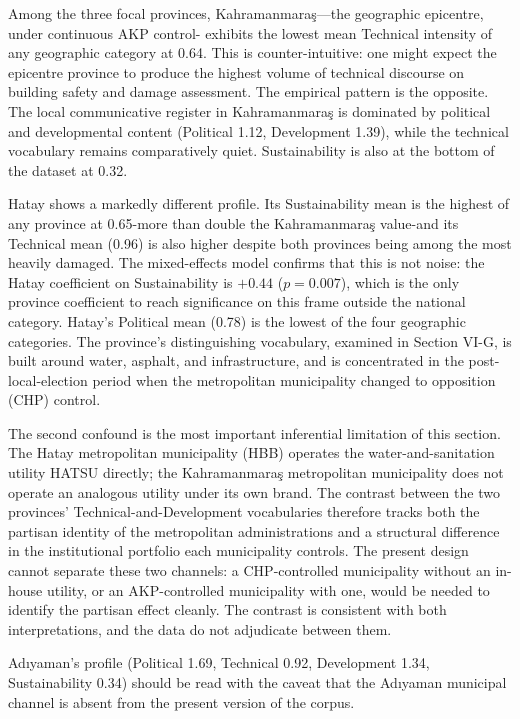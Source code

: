 \documentclass[12pt, journal]{IEEEtran}
\begin{document}
Among the three focal provinces, Kahramanmara\c{s}---the geographic epicentre, under continuous AKP control- exhibits the lowest mean Technical intensity of any geographic category at 0.64. This is counter-intuitive: one might expect the epicentre province to produce the highest volume of technical discourse on building safety and damage assessment. The empirical pattern is the opposite. The local communicative register in Kahramanmara\c{s} is dominated by political and developmental content (Political 1.12, Development 1.39), while the technical vocabulary remains comparatively quiet. Sustainability is also at the bottom of the dataset at 0.32.

Hatay shows a markedly different profile. Its Sustainability mean is the highest of any province at 0.65-more than double the Kahramanmara\c{s} value-and its Technical mean (0.96) is also higher despite both provinces being among the most heavily damaged. The mixed-effects model confirms that this is not noise: the Hatay coefficient on Sustainability is $+0.44$ ($p = 0.007$), which is the only province coefficient to reach significance on this frame outside the national category. Hatay's Political mean (0.78) is the lowest of the four geographic categories. The province's distinguishing vocabulary, examined in Section VI-G, is built around water, asphalt, and infrastructure, and is concentrated in the post-local-election period when the metropolitan municipality changed to opposition (CHP) control.

The second confound is the most important inferential limitation of this section. The Hatay metropolitan municipality (HBB) operates the water-and-sanitation utility HATSU directly; the Kahramanmara\c{s} metropolitan municipality does not operate an analogous utility under its own brand. The contrast between the two provinces' Technical-and-Development vocabularies therefore tracks both the partisan identity of the metropolitan administrations and a structural difference in the institutional portfolio each municipality controls. The present design cannot separate these two channels: a CHP-controlled municipality without an in-house utility, or an AKP-controlled municipality with one, would be needed to identify the partisan effect cleanly. The contrast is consistent with both interpretations, and the data do not adjudicate between them.

Ad\i yaman's profile (Political 1.69, Technical 0.92, Development 1.34, Sustainability 0.34) should be read with the caveat that the Ad\i yaman municipal channel is absent from the present version of the corpus.
\end{document}
